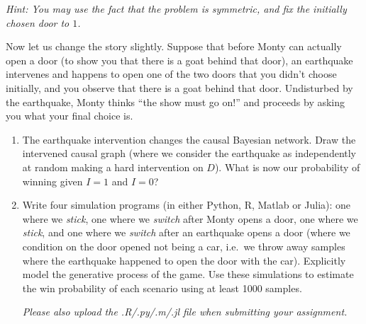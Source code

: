 \begin{enumerate}
\begin{enumerate}
    \emph{Hint: You may use the fact that the problem is symmetric, and fix the initially chosen door to $1$.}
  \end{enumerate}
  Now let us change the story slightly. Suppose that before Monty can actually open a door (to show you that there is a goat behind that door), an earthquake intervenes and happens to open one of the two doors that you didn't choose initially, and you observe that there is a goat behind that door. Undisturbed by the earthquake, Monty thinks ``the show must go on!'' and proceeds by asking you what your final choice is.
  \begin{enumerate}[resume*]
    \item The earthquake intervention changes the causal Bayesian network. Draw the intervened causal graph (where we consider the earthquake as independently at random making a hard intervention on $D$).
    What is now our probability of winning given $I=1$ and $I=0$?
    \item Write four simulation programs (in either Python, R, Matlab or Julia): one where we \emph{stick}, one where we \emph{switch} after Monty opens a door, one where we \emph{stick}, and one where we \emph{switch} after an earthquake opens a door (where we condition on the door opened not being a car, i.e.\ we throw away samples where the earthquake happened to open the door with the car).
    Explicitly model the generative process of the game. Use these simulations to estimate the win probability of each scenario using at least 1000 samples.

    \emph{Please also upload the .R/.py/.m/.jl file when submitting your assignment.}
  \end{enumerate}


\end{enumerate}
